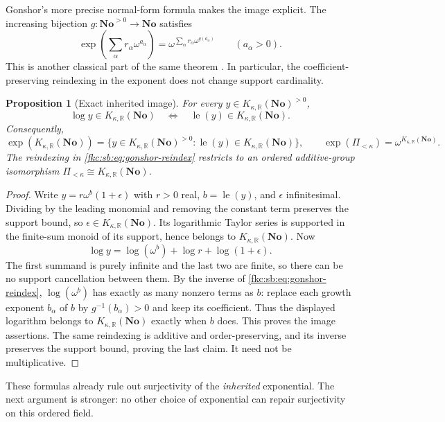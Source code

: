 \documentclass[11pt,letterpaper]{article}
\numberwithin{equation}{section}
\newtheorem{proposition}[theorem]{Proposition}
\theoremstyle{definition}
\theoremstyle{remark}
\newcommand{\R}{\mathbb R}
\newcommand{\No}{\mathbf{No}}
\newcommand{\lead}{\operatorname{le}}
\newcommand{\KN}[2]{K_{#1,#2}(\No)}%
\newcommand{\Pk}{\Pi_{<\kappa}}
\begin{document}
Gonshor's more precise normal-form formula makes the image explicit. The increasing bijection $g:\No^{>0}\to\No$ satisfies
\begin{equation}\label{fkc:sb:eq:gonshor-reindex}
 \exp\left(\sum_\alpha r_\alpha\omega^{a_\alpha}\right)
 =\omega^{\sum_\alpha r_\alpha\omega^{g(a_\alpha)}}
 \qquad(a_\alpha>0).
\end{equation}
This is another classical part of the same theorem \cite[Theorem~2.16]{MM}. In particular, the coefficient-preserving reindexing in the exponent does not change support cardinality.

\begin{proposition}[Exact inherited image]\label{fkc:sb:prop:expimage}
For every $y\in\KN\kappa\R^{>0}$,
\[
 \log y\in\KN\kappa\R\quad\Longleftrightarrow\quad
 \lead(y)\in\KN\kappa\R.
\]
Consequently,
\begin{equation}\label{fkc:sb:eq:expimage}
 \exp(\KN\kappa\R)=
 \{y\in\KN\kappa\R^{>0}:\lead(y)\in\KN\kappa\R\},\qquad
 \exp(\Pk)=\omega^{\KN\kappa\R}.
\end{equation}
The reindexing in \eqref{fkc:sb:eq:gonshor-reindex} restricts to an ordered additive-group isomorphism $\Pk\cong\KN\kappa\R$.
\end{proposition}
\begin{proof}
Write $y=r\omega^b(1+\epsilon)$ with $r>0$ real, $b=\lead(y)$, and $\epsilon$ infinitesimal. Dividing by the leading monomial and removing the constant term preserves the support bound, so $\epsilon\in\KN\kappa\R$. Its logarithmic Taylor series is supported in the finite-sum monoid of its support, hence belongs to $\KN\kappa\R$. Now
\[
 \log y=\log(\omega^b)+\log r+\log(1+\epsilon).
\]
The first summand is purely infinite and the last two are finite, so there can be no support cancellation between them. By the inverse of \eqref{fkc:sb:eq:gonshor-reindex}, $\log(\omega^b)$ has exactly as many nonzero terms as $b$: replace each growth exponent $b_\alpha$ of $b$ by $g^{-1}(b_\alpha)>0$ and keep its coefficient. Thus the displayed logarithm belongs to $\KN\kappa\R$ exactly when $b$ does. This proves the image assertions. The same reindexing is additive and order-preserving, and its inverse preserves the support bound, proving the last claim. It need not be multiplicative.
\end{proof}

These formulas already rule out surjectivity of the \emph{inherited} exponential. The next argument is stronger: no other choice of exponential can repair surjectivity on this ordered field.
\end{document}
